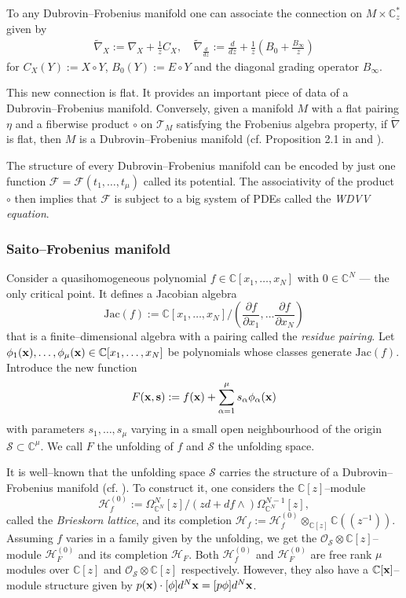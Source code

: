 \documentclass[12pt,a4paper]{amsart}
\newcommand{\CC}{{\mathbb{C}}}
\newcommand{\calS}{{\cal S}}
\newcommand{\F}[2]{{F_{#1}^{#2}}}
\newcommand{\Jac}{\mathrm{Jac}}
\newcommand{\bx}{{\bf x}}
\def\F{{\mathcal F}}
\def\H{{\mathcal H}}
\def\O{{\mathcal O}}
\def\T{{\mathcal T}}
\def\calS{{\mathcal S}}
\newcommand{\p}{{\partial}}
\newcommand{\<}{\left<}
\renewcommand{\>}{\right>}
\newcommand{\bs}{{\bf s}}
\def\ns{{\nabla}\hspace{-1.2mm}{\text{\footnotesize{\bf /}}}}
\numberwithin{equation}{section}
\begin{document}
To any Dubrovin--Frobenius manifold one can associate the connection on $M \times \CC^\ast_z$ given by
\begin{align}\label{eq: Dubrovin connection-1}
    \widetilde \nabla_X := \nabla_X + \frac{1}{z} C_X, \quad \widetilde \nabla_{\frac{d}{dz}} := \frac{d}{dz} + \frac{1}{z} \left( B_0 + \frac{B_\infty}{z} \right)
\end{align}
for $C_X(Y) := X \circ Y$, $B_0(Y) := E \circ Y$ and the diagonal grading operator $B_\infty$.

This new connection is flat. It provides an important piece of data of a Dubrovin--Frobenius manifold. Conversely, given a manifold $M$ with a flat pairing $\eta$ and a fiberwise product $\circ$ on $\T_M$ satisfying the Frobenius algebra property, if $\widetilde \nabla$ is flat, then $M$ is a Dubrovin--Frobenius manifold (cf. Proposition 2.1 in \cite{D2} and \cite{Sa}).

The structure of every Dubrovin--Frobenius manifold can be encoded by just one function $\F = \F(t_1,\dots,t_\mu)$ called its potential.
The associativity of the product $\circ$ then implies that $\F$ is subject to a big system of PDEs called the \textit{WDVV equation}.

\subsubsection{Saito--Frobenius manifold}
Consider a quasihomogeneous polynomial $f \in \CC[x_1,\dots,x_N]$ with $0 \in \CC^N$ --- the only critical point. It defines a Jacobian algebra
\[
 \Jac(f) := \CC[x_1,\dots,x_N] / (\frac{\p f}{\p x_1},\dots \frac{\p f}{\p x_N})
\]
that is a finite--dimensional algebra with a pairing called the \textit{residue pairing}. Let $\phi_1(\bx),\dots, \phi_\mu(\bx) \in \CC[x_1,\dots,x_N]$ be polynomials whose classes generate $\Jac(f)$. Introduce the new function
\[
 F(\bx,\bs) := f(\bx) + \sum_{\alpha=1}^\mu s_\alpha \phi_\alpha(\bx)
\]
with parameters $s_1,\dots,s_\mu$ varying in a small open neighbourhood of the origin $\calS \subset \CC^\mu$. We call $F$ the unfolding of $f$ and $\calS$ the unfolding space.


It is well--known that the unfolding space $\calS$ carries the structure of a Dubrovin--Frobenius manifold (cf. \cite{ST,D1,D2,Sa, H}). To construct it, one considers the $\CC[z]$--module
\[
\H_f^{(0)} := \Omega^N_{\CC^N}[z] / (zd + df \wedge) \Omega^{N-1}_{\CC^N}[z],
\]
called the \textit{Brieskorn lattice}, and its completion $\H_f := \H_f^{(0)} \otimes_{\CC[z]} \CC((z^{-1}))$. Assuming $f$ varies in a family given by the unfolding, we get the $\O_\calS \otimes \CC[z]$--module $\H_F^{(0)}$ and its completion $\H_F$.
Both $\H_f^{(0)}$ and $\H_F^{(0)}$ are free rank $\mu$ modules over $\CC[z]$ and $\O_\calS \otimes \CC[z]$ respectively. However, they also have a $\CC[\bx]$--module structure given by $p(\bx) \cdot [\phi] d^N\bx = [p \phi] d^N\bx$.
\end{document}
